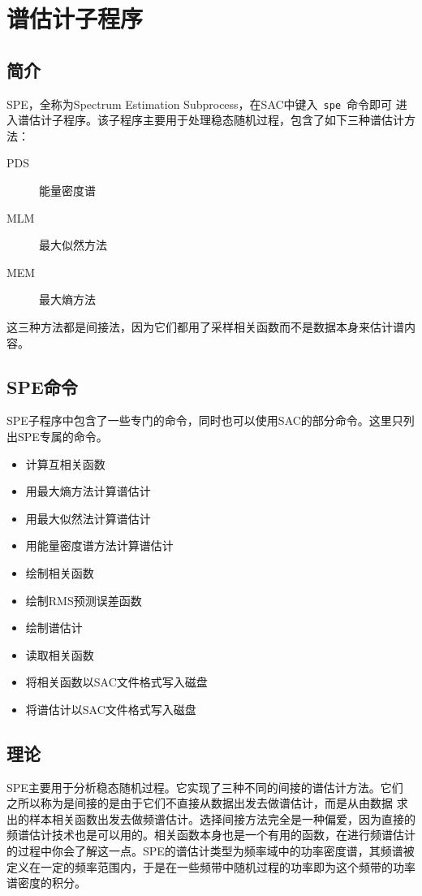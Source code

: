 \section{谱估计子程序}

\subsection{简介}
SPE，全称为Spectrum Estimation Subprocess，在SAC中键入~\verb+spe+~命令即可
进入谱估计子程序。该子程序主要用于处理稳态随机过程，包含了如下三种谱估计方法：

\begin{description}
\item [PDS] 能量密度谱
\item [MLM] 最大似然方法
\item [MEM] 最大熵方法
\end{description}

这三种方法都是间接法，因为它们都用了采样相关函数而不是数据本身来估计谱内容。

\subsection{SPE命令}
SPE子程序中包含了一些专门的命令，同时也可以使用SAC的部分命令。这里只列出SPE专属的命令。
\begin{itemize}
\item {} 计算互相关函数
\item {} 用最大熵方法计算谱估计
\item {} 用最大似然法计算谱估计
\item {} 用能量密度谱方法计算谱估计
\item {} 绘制相关函数
\item {} 绘制RMS预测误差函数
\item {} 绘制谱估计
\item {} 读取相关函数
\item {} 将相关函数以SAC文件格式写入磁盘
\item {} 将谱估计以SAC文件格式写入磁盘
\end{itemize}

\subsection{理论}
SPE主要用于分析稳态随机过程。它实现了三种不同的间接的谱估计方法。它们
之所以称为是间接的是由于它们不直接从数据出发去做谱估计，而是从由数据
求出的样本相关函数出发去做频谱估计。选择间接方法完全是一种偏爱，因为直接的
频谱估计技术也是可以用的。相关函数本身也是一个有用的函数，在进行频谱估计
的过程中你会了解这一点。SPE的谱估计类型为频率域中的功率密度谱，其频谱被
定义在一定的频率范围内，于是在一些频带中随机过程的功率即为这个频带的功率
谱密度的积分。

